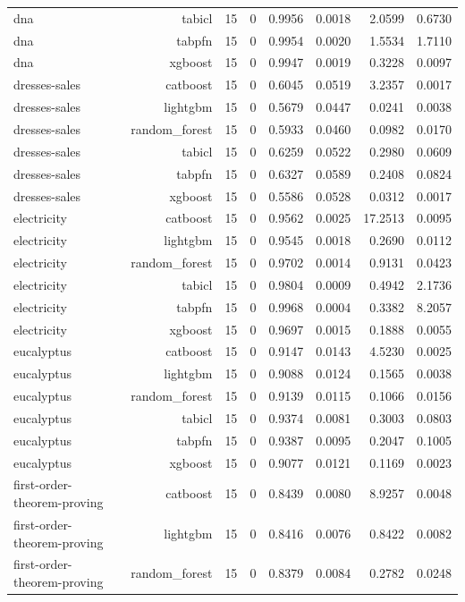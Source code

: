 \begin{table}[htbp]
\begin{tabular}{lrrrrrrr}
dna & tabicl & 15 & 0 & 0.9956 & 0.0018 & 2.0599 & 0.6730 \\
dna & tabpfn & 15 & 0 & 0.9954 & 0.0020 & 1.5534 & 1.7110 \\
dna & xgboost & 15 & 0 & 0.9947 & 0.0019 & 0.3228 & 0.0097 \\
dresses-sales & catboost & 15 & 0 & 0.6045 & 0.0519 & 3.2357 & 0.0017 \\
dresses-sales & lightgbm & 15 & 0 & 0.5679 & 0.0447 & 0.0241 & 0.0038 \\
dresses-sales & random\_forest & 15 & 0 & 0.5933 & 0.0460 & 0.0982 & 0.0170 \\
dresses-sales & tabicl & 15 & 0 & 0.6259 & 0.0522 & 0.2980 & 0.0609 \\
dresses-sales & tabpfn & 15 & 0 & 0.6327 & 0.0589 & 0.2408 & 0.0824 \\
dresses-sales & xgboost & 15 & 0 & 0.5586 & 0.0528 & 0.0312 & 0.0017 \\
electricity & catboost & 15 & 0 & 0.9562 & 0.0025 & 17.2513 & 0.0095 \\
electricity & lightgbm & 15 & 0 & 0.9545 & 0.0018 & 0.2690 & 0.0112 \\
electricity & random\_forest & 15 & 0 & 0.9702 & 0.0014 & 0.9131 & 0.0423 \\
electricity & tabicl & 15 & 0 & 0.9804 & 0.0009 & 0.4942 & 2.1736 \\
electricity & tabpfn & 15 & 0 & 0.9968 & 0.0004 & 0.3382 & 8.2057 \\
electricity & xgboost & 15 & 0 & 0.9697 & 0.0015 & 0.1888 & 0.0055 \\
eucalyptus & catboost & 15 & 0 & 0.9147 & 0.0143 & 4.5230 & 0.0025 \\
eucalyptus & lightgbm & 15 & 0 & 0.9088 & 0.0124 & 0.1565 & 0.0038 \\
eucalyptus & random\_forest & 15 & 0 & 0.9139 & 0.0115 & 0.1066 & 0.0156 \\
eucalyptus & tabicl & 15 & 0 & 0.9374 & 0.0081 & 0.3003 & 0.0803 \\
eucalyptus & tabpfn & 15 & 0 & 0.9387 & 0.0095 & 0.2047 & 0.1005 \\
eucalyptus & xgboost & 15 & 0 & 0.9077 & 0.0121 & 0.1169 & 0.0023 \\
first-order-theorem-proving & catboost & 15 & 0 & 0.8439 & 0.0080 & 8.9257 & 0.0048 \\
first-order-theorem-proving & lightgbm & 15 & 0 & 0.8416 & 0.0076 & 0.8422 & 0.0082 \\
first-order-theorem-proving & random\_forest & 15 & 0 & 0.8379 & 0.0084 & 0.2782 & 0.0248 \\

\end{tabular}
\end{table}
